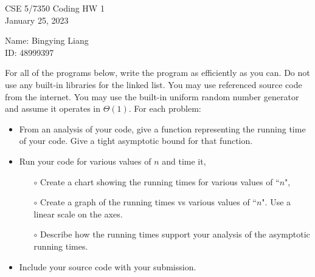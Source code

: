 \documentclass{article}
\begin{document}
\begin{center}
CSE 5/7350 Coding HW 1\\
January 25, 2023\\
\end{center}

\begin{flushright}
Name: Bingying Liang\\
ID: 48999397
\end{flushright}


\noindent For all of the programs below, write the program as efficiently as you can. Do not use any built-in libraries for the linked list. You may use referenced source code from the internet.  You may use the built-in uniform random number generator and assume it operates in $\Theta(1)$.  For each problem:
\begin{itemize}
    \item From an analysis of your code, give a function representing the running time of your code. Give a tight asymptotic bound for that function. 
    \item Run your code for various values of $n$ and time it, 
    \begin{itemize}
        \item[$\circ$] Create a chart showing the running times for various values of ``$n$", 
        \item[$\circ$] Create a graph of the running times vs various values of ``$n$". Use a linear scale on the axes.
        \item[$\circ$] Describe how the running times support your analysis of the asymptotic running times.
    \end{itemize}

    \item Include your source code with your submission.
\end{itemize}
\end{document}
